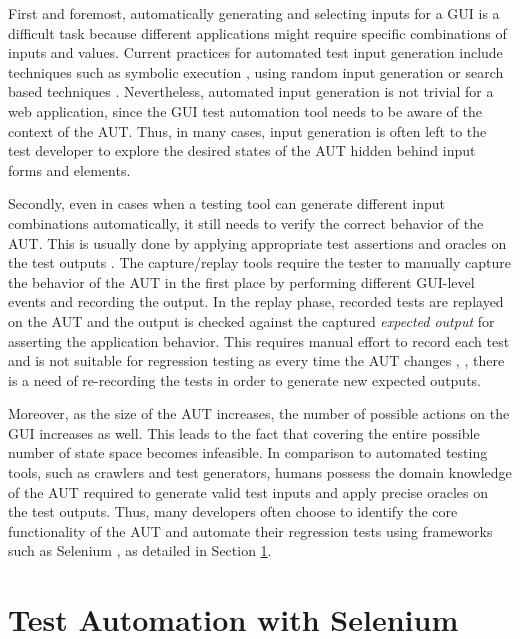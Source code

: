 First and foremost, automatically generating and selecting inputs for a GUI is a difficult task because different applications might require specific combinations of inputs and values. 
Current practices for automated test input generation include techniques such as symbolic execution \cite{Ganovetal}, using random input generation \cite{godefroid2005dart} or search based techniques \cite{gross2012search}. Nevertheless, automated input generation is not trivial for a web application, since the GUI test automation tool needs to be aware of the context of the AUT. Thus, in many cases, input generation is often left to the test developer to explore the desired states of the AUT hidden behind input forms and elements.

Secondly, even in cases when a testing tool can generate different input combinations automatically, it still needs to verify the correct behavior of the AUT. This is usually done by applying appropriate test assertions and oracles on the test outputs \cite{Baresi:Oracles}. The capture/replay tools \cite{joshi2006capture} require the tester to manually capture the behavior of the AUT in the first place by performing different GUI-level events and recording the output. In the replay phase, recorded tests are replayed on the AUT and the output is checked against the captured \textit{expected output} for asserting the application behavior. This requires manual effort to record each test and is not suitable for regression testing as every time the AUT changes \cite{sjosten2006costs}, \cite{leotta2013capture}, there is a need of re-recording the tests in order to generate new expected outputs. 

Moreover, as the size of the AUT increases, the number of possible actions on the GUI increases as well. This leads to the fact that covering the entire possible number of state space becomes infeasible. In comparison to automated testing tools, such as crawlers and test generators, humans possess the domain knowledge of the AUT required to generate valid test inputs and apply precise oracles on the test outputs. Thus, many developers often choose to identify the core functionality of the AUT and automate their regression tests using frameworks such as Selenium \cite{websiteSelenium}, as detailed in Section \ref{sec:SeleniumTesting}.

\section{Test Automation with Selenium}
\label{sec:SeleniumTesting}
